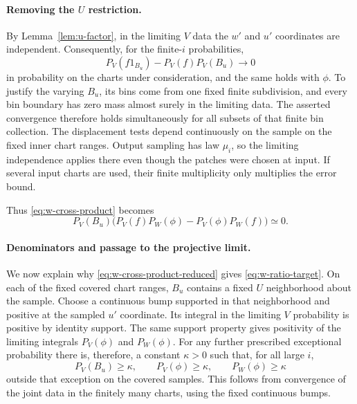 \paragraph{Removing the \(U\) restriction.}
By Lemma~\ref{lem:u-factor}, in the limiting \(V\) data the
\(w'\) and \(u'\) coordinates are independent.  Consequently,
for the finite-\(i\) probabilities,
\[
       P_V(f1_{B_u})-P_V(f)P_V(B_u)\longrightarrow0
\]
in probability on the charts under consideration, and the same
holds with \(\phi\).  To justify the varying \(B_u\), its bins
come from one fixed finite subdivision, and every bin boundary
has zero mass almost surely in the limiting data.  The asserted
convergence therefore holds simultaneously for all subsets of
that finite bin collection.  The displacement tests depend
continuously on the sample on the fixed inner chart ranges.
Output sampling has law \(\mu_i\), so the limiting independence
applies there even though the patches were chosen at input.
If several input charts are used, their finite multiplicity
only multiplies the error bound.

Thus \eqref{eq:w-cross-product} becomes
\begin{equation}\label{eq:w-cross-product-reduced}
 P_V(B_u)
       \bigl(P_V(f)P_W(\phi)-P_V(\phi)P_W(f)\bigr)
                            \simeq0.
\end{equation}

\paragraph{Denominators and passage to the projective limit.}
We now explain why \eqref{eq:w-cross-product-reduced} gives
\eqref{eq:w-ratio-target}.  On each of the fixed covered chart
ranges, \(B_u\) contains a fixed \(U\) neighborhood about the
sample.  Choose a continuous bump supported in that neighborhood
and positive at the sampled \(u'\) coordinate.  Its integral in
the limiting \(V\) probability is positive by identity support.
The same support property gives positivity of the limiting
integrals \(P_V(\phi)\) and \(P_W(\phi)\).
For any further prescribed exceptional probability there is,
therefore, a constant \(\kappa>0\) such that, for all large \(i\),
\begin{equation}\label{eq:w-denominators}
          P_V(B_u)\ge\kappa,\qquad
          P_V(\phi)\ge\kappa,\qquad
          P_W(\phi)\ge\kappa
\end{equation}
outside that exception on the covered samples.
This follows from convergence of the joint data in the finitely
many charts, using the fixed continuous bumps.

